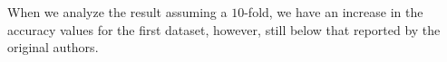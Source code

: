 

When we analyze the result assuming a $10$-fold, we have an increase in the accuracy values for the first dataset, however, still below that reported by the original authors.

